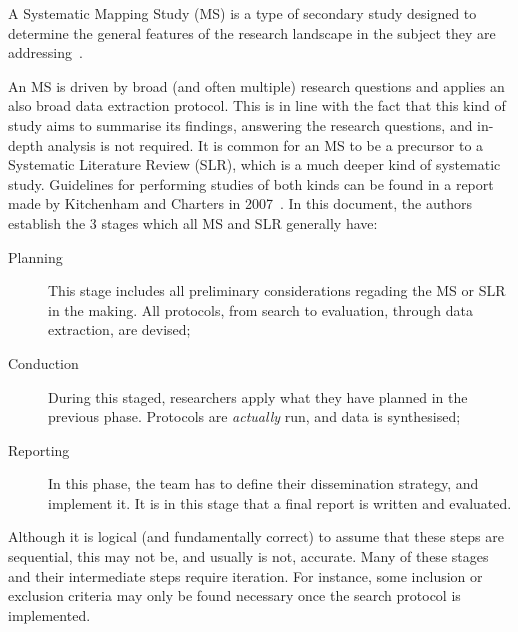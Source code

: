 A Systematic Mapping Study (MS) is a type of secondary study designed to
determine the general features of the research landscape in the subject
they are addressing~\cite{Kitchenham2007, Petersen2008}.

An MS is driven by broad (and often multiple) research questions and
applies an also broad data extraction protocol. This is in line with the
fact that this kind of study aims to summarise its findings, answering
the research questions, and in-depth analysis is not required. It is
common for an MS to be a precursor to a Systematic Literature Review
(SLR), which is a much deeper kind of systematic study. Guidelines for
performing studies of both kinds can be found in a report made by
Kitchenham and Charters in 2007~\cite{Kitchenham2007}. In this document,
the authors establish the 3 stages which all MS and SLR generally have:

\begin{description}
    \item[Planning] This stage includes all preliminary considerations
        regading the MS or SLR in the making. All protocols, from search
        to evaluation, through data extraction, are devised;
    \item[Conduction] During this staged, researchers apply what they
        have planned in the previous phase. Protocols are
        \emph{actually} run, and data is synthesised;
    \item[Reporting] In this phase, the team has to define their
        dissemination strategy, and implement it. It is in this stage
        that a final report is written and evaluated.
\end{description}

Although it is logical (and fundamentally correct) to assume that these
steps are sequential, this may not be, and usually is not, accurate.
Many of these stages and their intermediate steps require iteration. For
instance, some inclusion or exclusion criteria may only be found
necessary once the search protocol is implemented.




